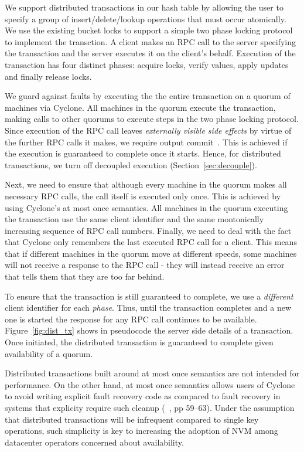 \documentclass[letterpaper,twocolumn,10pt]{article}
\begin{document}
We support distributed transactions in our hash table by allowing the user to
specify a group of insert/delete/lookup operations that must occur
atomically. We use the existing bucket locks to support a simple two phase
locking protocol to implement the transction. A client makes an RPC call to the
server specifying the transaction and the server executes it on the client's
behalf. Execution of the transaction has four distinct phases: acquire locks,
verify values, apply updates and finally release locks.

We guard against faults by executing the the entire transaction on a quorum of
machines via Cyclone. All machines in the quorum execute the transaction, making
calls to other quorums to execute steps in the two phase locking protocol. Since
execution of the RPC call leaves \emph{externally visible side effects} by
virtue of the further RPC calls it makes, we require output
commit~\cite{output_commit}. This is achieved if the execution is guaranteed to
complete once it starts. Hence, for distributed transactions, we turn off
decoupled execution (Section~\ref{sec:decouple}).

Next, we need to ensure that although every machine in the quorum makes all
necessary RPC calls, the call itself is executed only once. This is achieved by
using Cyclone's at most once semantics. All machines in the quorum executing the
transaction use the same client identifier and the same montonically increasing
sequence of RPC call numbers. Finally, we need to deal with the fact that
Cyclone only remembers the last executed RPC call for a client. This means that
if different machines in the quorum move at different speeds, some machines will
not receive a response to the RPC call - they will instead receive an error that
tells them that they are too far behind.

To ensure that the transaction is still guaranteed to complete, we use a
\emph{different} client identifier for each \emph{phase}. Thus, until the
transaction completes and a new one is started the response for any RPC call
continues to be available. Figure~\ref{fig:dist_tx} shows in pseudocode the
server side details of a transaction. Once initiated, the distributed transaction
is guaranteed to complete given availability of a quorum.

Distributed transactions built around at most once semantics are not intended
for performance. On the other hand, at most once semantics allows users of
Cyclone to avoid writing explicit fault recovery code as compared to fault
recovery in systems that explicity require such cleanup (~\cite{farm}, pp
59--63). Under the assumption that distributed transactions will be infrequent
compared to single key operations, such simplicity is key to increasing the
adoption of NVM among datacenter operators concerned about availability. 
\end{document}

